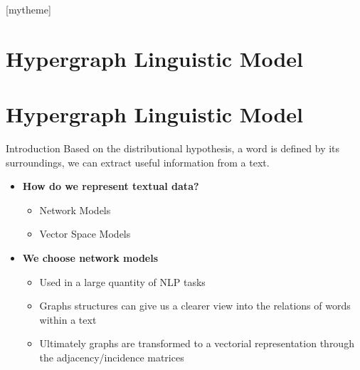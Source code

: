 \documentclass[10pt,xcolor=table]{beamer}
\begin{document}
[mytheme]

\section[Contributions in Detail]{Hypergraph Linguistic Model}
\section{Hypergraph Linguistic Model}
%


\begin{frame}{Introduction}
\vspace{.5cm}
Based on the distributional hypothesis, a word is defined by its surroundings, we can extract useful information from a text.
\begin{itemize}[<+- | alert@+>]
	\item \textbf{How do we represent textual data?}
		\begin{itemize}
		\item Network Models \cite{2004.Mihalcea.SemanticNetworkPageRank}
		\item Vector Space Models \cite{manning1999foundations}

		
		\end{itemize}
	\vspace{.5cm}
	\item \textbf{We choose network models} 
		\begin{itemize}
		\item Used in a large quantity of NLP tasks \cite{Mihalcea2011}
		\item Graphs structures can give us a clearer view into the relations of words within a text 	\cite{Choudhury2009}
		\item Ultimately graphs are transformed to a vectorial representation through the adjacency/incidence matrices
		
		\end{itemize}
		
\end{itemize}
\vspace{\textheight}
\end{frame}
\end{document}
